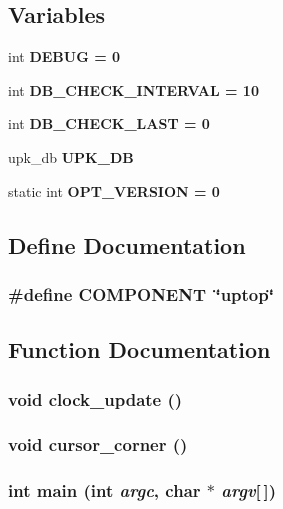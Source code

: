 \subsection*{Variables}
\begin{CompactItemize}
\item 
int \bf{DEBUG} = 0
\item 
int \bf{DB\_\-CHECK\_\-INTERVAL} = 10
\item 
int \bf{DB\_\-CHECK\_\-LAST} = 0
\item 
upk\_\-db \bf{UPK\_\-DB}
\item 
static int \bf{OPT\_\-VERSION} = 0
\end{CompactItemize}


\subsection{Define Documentation}
\subsubsection{\setlength{\rightskip}{0pt plus 5cm}\#define COMPONENT~\char`\"{}uptop\char`\"{}}\label{main_8c_923d1e201cd277f26fb7f65b516e06dc}




\subsection{Function Documentation}
\subsubsection{\setlength{\rightskip}{0pt plus 5cm}void clock\_\-update ()}\label{main_8c_deffdc8d9373f8b15db03c6f3f283a0c}


\subsubsection{\setlength{\rightskip}{0pt plus 5cm}void cursor\_\-corner ()}\label{main_8c_6298b79dce94f2beb37f4a6a8c56d3e1}


\subsubsection{\setlength{\rightskip}{0pt plus 5cm}int main (int {\em argc}, char $\ast$ {\em argv}[$\,$])}\label{main_8c_28052c36c3b61c6c0eaa18f5d226118f}


